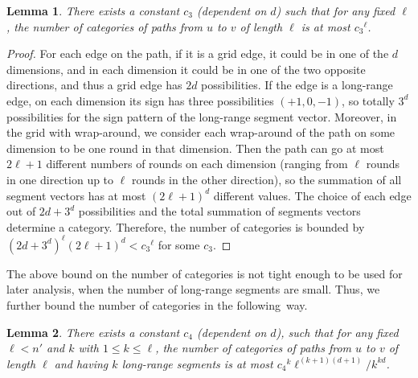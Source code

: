 \documentclass[11pt]{article}
\newtheorem{lem}{Lemma}
\begin{document}
\begin{lem} \label{lemma:numcate2}
There exists a constant $c_3$ (dependent on $d$) such that
	for any fixed $\ell$, the number of categories of paths from
	$u$ to $v$ of
	length $\ell$ is at most ${c_3}^\ell$.
\end{lem}
\begin{proof}
For each edge on the path, if it is a grid edge, it could be in one of
	the $d$ dimensions, and in each dimension it could be in one of the
	two opposite directions, and thus a grid edge has $2d$ possibilities.
If the edge is a long-range edge, on each dimension its sign has three
	possibilities $(+1,0,-1)$, so totally $3^d$ possibilities for
	the sign pattern of the long-range segment vector.
Moreover, in the grid with wrap-around, we consider each wrap-around 
	of the path on some dimension to be one round in that dimension.
Then the path can go at most $2\ell+1$ different numbers of rounds on each dimension (ranging from $\ell$ rounds in one direction up to $\ell$ rounds in the other direction), so the summation of all segment vectors has at most $(2\ell+1)^d$ different values.
The choice of each edge out of $2d+3^d$ possibilities and the total summation of segments vectors determine a category.
Therefore, the number of categories is bounded by $(2d+3^d)^\ell(2\ell+1)^d<{c_3}^\ell$ for some $c_3$.
\end{proof}

The above bound on the number of categories is not tight enough to be
	used for later analysis, when the number of long-range segments
	are small.
Thus, we further bound the number of categories in the following~way.

\begin{lem} \label{lemma:numcate1}
There exists a constant $c_4$ (dependent on $d$), such that for
	any fixed $\ell<n'$ and $k$ with $1\leq k\leq \ell$, 
	the number of categories of paths from $u$ to $v$ of length 
	$\ell$ and having $k$ long-range segments is 
	at most ${c_4}^k\ell^{(k+1)(d+1)}/k^{kd}$.
\end{lem}
\end{document}
